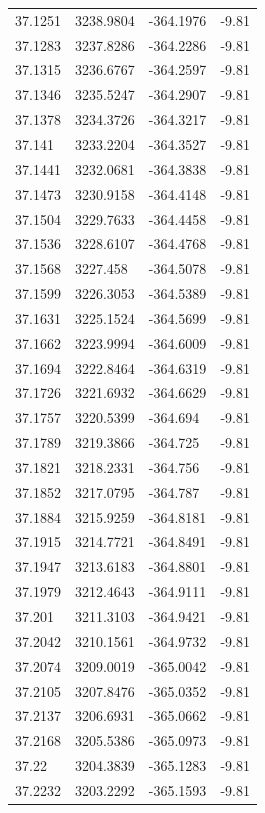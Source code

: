 \begin{table}[H]
\begin{tabular}{llll}
37.1251 & 3238.9804 & -364.1976 & -9.81 \\
37.1283 & 3237.8286 & -364.2286 & -9.81 \\
37.1315 & 3236.6767 & -364.2597 & -9.81 \\
37.1346 & 3235.5247 & -364.2907 & -9.81 \\
37.1378 & 3234.3726 & -364.3217 & -9.81 \\
37.141 & 3233.2204 & -364.3527 & -9.81 \\
37.1441 & 3232.0681 & -364.3838 & -9.81 \\
37.1473 & 3230.9158 & -364.4148 & -9.81 \\
37.1504 & 3229.7633 & -364.4458 & -9.81 \\
37.1536 & 3228.6107 & -364.4768 & -9.81 \\
37.1568 & 3227.458 & -364.5078 & -9.81 \\
37.1599 & 3226.3053 & -364.5389 & -9.81 \\
37.1631 & 3225.1524 & -364.5699 & -9.81 \\
37.1662 & 3223.9994 & -364.6009 & -9.81 \\
37.1694 & 3222.8464 & -364.6319 & -9.81 \\
37.1726 & 3221.6932 & -364.6629 & -9.81 \\
37.1757 & 3220.5399 & -364.694 & -9.81 \\
37.1789 & 3219.3866 & -364.725 & -9.81 \\
37.1821 & 3218.2331 & -364.756 & -9.81 \\
37.1852 & 3217.0795 & -364.787 & -9.81 \\
37.1884 & 3215.9259 & -364.8181 & -9.81 \\
37.1915 & 3214.7721 & -364.8491 & -9.81 \\
37.1947 & 3213.6183 & -364.8801 & -9.81 \\
37.1979 & 3212.4643 & -364.9111 & -9.81 \\
37.201 & 3211.3103 & -364.9421 & -9.81 \\
37.2042 & 3210.1561 & -364.9732 & -9.81 \\
37.2074 & 3209.0019 & -365.0042 & -9.81 \\
37.2105 & 3207.8476 & -365.0352 & -9.81 \\
37.2137 & 3206.6931 & -365.0662 & -9.81 \\
37.2168 & 3205.5386 & -365.0973 & -9.81 \\
37.22 & 3204.3839 & -365.1283 & -9.81 \\
37.2232 & 3203.2292 & -365.1593 & -9.81 \\

\end{tabular}
\end{table}
